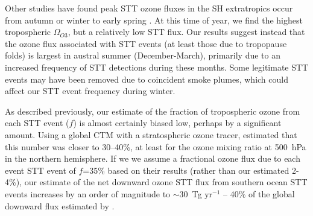 \documentclass{article}
\begin{document}
  Other studies have found peak STT ozone fluxes in the SH extratropics occur from autumn or winter to early spring \citep{Olsen2003, Liu2016}. 
  At this time of year, we find the highest tropospheric $\Omega_{O3}$, but a relatively low STT flux.
  Our results suggest instead that the ozone flux associated with STT events (at least those due to tropopause folds) is largest in austral summer (December-March), primarily due to an increased frequency of STT detections during these months.
  Some legitimate STT events may have been removed due to coincident smoke plumes, which could affect our STT event frequency during winter.
  

  As described previously, our estimate of the fraction of tropospheric ozone from each STT event ($f$) is almost certainly biased low, perhaps by a significant amount. 
  Using a global CTM with a stratospheric ozone tracer, \citet{Terao2008} estimated that this number was closer to 30--40\%, at least for the ozone mixing ratio at 500~hPa in the northern hemisphere.
  If we we assume a fractional ozone flux due to each event STT event of $f$=35\% based on their results (rather than our estimated 2-4\%), our estimate of the net downward ozone STT flux from southern ocean STT events increases by an order of magnitude to $\sim$30~Tg yr$^{-1}$ -- 40\% of the global downward flux estimated by \citet{Sprenger2003}.
\end{document}
